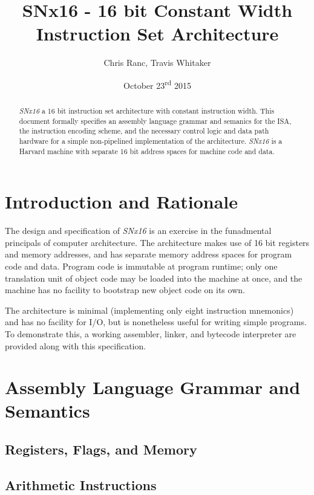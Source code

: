 \documentclass{article}
\begin{document}
\title{SNx16 - 16 bit Constant Width Instruction Set Architecture}
\author{Chris Ranc, Travis Whitaker}
\date{October 23\textsuperscript{rd} 2015}
\maketitle

\begin{abstract}
\emph{SNx16} a 16 bit instruction set architecture with constant instruction
width. This document formally specifies an assembly language grammar and
semanics for the ISA, the instruction encoding scheme, and the necessary control
logic and data path hardware for a simple non-pipelined implementation of the
architecture. \emph{SNx16} is a Harvard machine with separate 16 bit address
spaces for machine code and data.
\end{abstract}


\section{Introduction and Rationale}

The design and specification of \emph{SNx16} is an exercise in the funadmental
principals of computer architecture. The architecture makes use of 16 bit
registers and memory addresses, and has separate memory address spaces for
program code and data. Program code is immutable at program runtime; only one
translation unit of object code may be loaded into the machine at once, and the
machine has no facility to bootstrap new object code on its own.

The architecture is minimal (implementing only eight instruction mnemonics) and has no facility for I/O, but is nonetheless useful for writing simple programs. To demonstrate this, a working assembler, linker, and bytecode interpreter are provided along with this specification.

\section{Assembly Language Grammar and Semantics}
\subsection{Registers, Flags, and Memory}
\subsection{Arithmetic Instructions}
\end{document}
